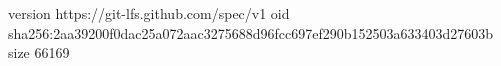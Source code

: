 version https://git-lfs.github.com/spec/v1
oid sha256:2aa39200f0dac25a072aac3275688d96fcc697ef290b152503a633403d27603b
size 66169
